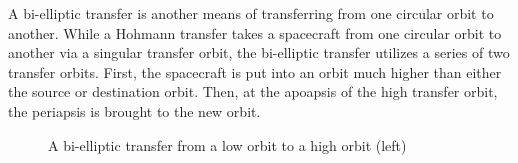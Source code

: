 \documentclass{article}
\begin{document}
A bi-elliptic transfer is another means of transferring from one circular orbit to another. While a Hohmann transfer takes a spacecraft from one circular orbit to another via a singular transfer orbit, the bi-elliptic transfer utilizes a series of two transfer orbits. First, the spacecraft is put into an orbit much higher than either the source or destination orbit. Then, at the apoapsis of the high transfer orbit, the periapsis is brought to the new orbit.

\begin{figure}[H]
    \centering
    \def\Rone{0.75}
    \def\Rtwo{1.25}
    \def\trAP{4}
    \def\trSMAa{\fpeval{0.5*(\Rone+\trAP)}}
    \def\trSMAb{\fpeval{0.5*(\Rtwo+\trAP)}}
    \def\trEa{\fpeval{(\trAP/\trSMAa) - 1}}
    \def\trEb{\fpeval{(\trAP/\trSMAb) - 1}}
    \def\ctrXa{\fpeval{\Rone-\trSMAa}}
    \def\ctrXb{\fpeval{\Rtwo-\trSMAb}}
    \def\trSmAa{\fpeval{\trSMAa*sqrt(1-(\trEa)^2)}}
    \def\trSmAb{\fpeval{\trSMAb*sqrt(1-(\trEb)^2)}}
    \def\dV{1.25}
    \caption{A bi-elliptic transfer from a low orbit to a high orbit (left)}\label{fig:Bielliptic Transfer}
\end{figure}

\end{document}
